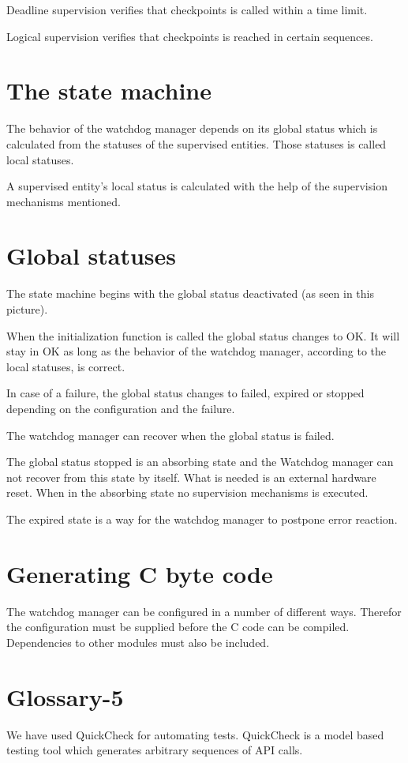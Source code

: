 \documentclass[a4paper]{article}
\begin{document}
Deadline supervision verifies that checkpoints is called within a time
limit.

Logical supervision verifies that checkpoints is reached in certain sequences.

\section{The state machine}
The behavior of the watchdog manager depends on its global status
which is calculated from the statuses of the supervised
entities. Those statuses is called local statuses.

A supervised entity's local status is calculated with the help of the
supervision mechanisms mentioned.

\section{Global statuses}
The state machine begins with the global status deactivated (as seen
in this picture).

When the initialization function is called the global status changes
to OK.
It will stay in OK as long as the behavior of the watchdog manager,
according to the local statuses, is correct.

In case of a failure, the global status changes to failed, expired or
stopped depending on the configuration and the failure.

The watchdog manager can recover when the global status is failed.

The global status stopped is an absorbing state and the Watchdog
manager can not recover from this state by itself. What is needed is
an external hardware reset. When in the absorbing state no supervision
mechanisms is executed.

The expired state is a way for the watchdog manager to postpone error
reaction.

\section{Generating C byte code}
The watchdog manager can be configured in a number of different
ways. Therefor the configuration must be supplied before the C code
can be compiled. Dependencies to other modules must also be included.

\section{Glossary-5}
We have used QuickCheck for automating tests. QuickCheck is a model
based testing tool which generates arbitrary sequences of API calls.
\end{document}
